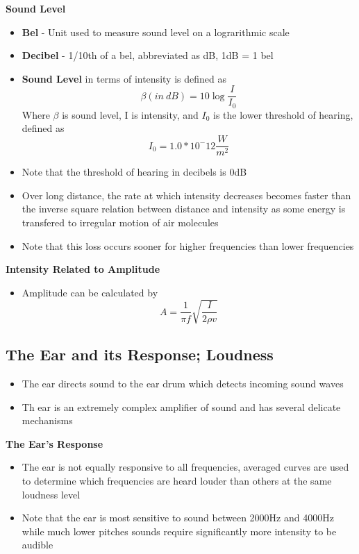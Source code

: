 \textbf{Sound Level}
\begin{itemize}
    \item \textbf{Bel} - Unit used to measure sound level on a lograrithmic scale
    \item \textbf{Decibel} - 1/10th of a bel, abbreviated as dB, 1dB = 1 bel
    \item \textbf{Sound Level} in terms of intensity is defined as \[\beta(in\  dB)=10\log\frac{I}{I_0}\] Where \(\beta\) is sound level, I is intensity, and \(I_0\) is the lower threshold of hearing, defined as \[I_0=1.0*10^-12\frac{W}{m^2}\]
    \item Note that the threshold of hearing in decibels is 0dB
    \item Over long distance, the rate at which intensity decreases becomes faster than the inverse square relation between distance and intensity as some energy is transfered to irregular motion of air molecules
    \item Note that this loss occurs sooner for higher frequencies than lower frequencies
\end{itemize}

\textbf{Intensity Related to Amplitude}
\begin{itemize}
    \item Amplitude can be calculated by \[A=\frac{1}{\pi f}\sqrt{\frac{I}{2\rho v}}\]
\end{itemize}

\subsection{The Ear and its Response; Loudness}
\begin{itemize}
    \item The ear directs sound to the ear drum which detects incoming sound waves
    \item Th ear is an extremely complex amplifier of sound and has several delicate mechanisms
\end{itemize}

\textbf{The Ear's Response}
\begin{itemize}
    \item The ear is not equally responsive to all frequencies, averaged curves are used to determine which frequencies are heard louder than others at the same loudness level
    \item Note that the ear is most sensitive to sound between 2000Hz and 4000Hz while much lower pitches sounds require significantly more intensity to be audible
\end{itemize}

